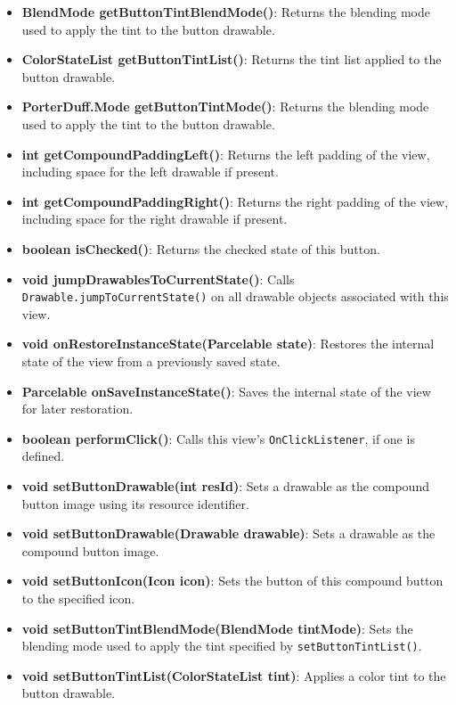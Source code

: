 \documentclass{report}
\begin{document}
\begin{itemize}
\begin{itemize}
                \item \textbf{BlendMode getButtonTintBlendMode()}: Returns the blending mode used to apply the tint to the button drawable.
                \item \textbf{ColorStateList getButtonTintList()}: Returns the tint list applied to the button drawable.
                \item \textbf{PorterDuff.Mode getButtonTintMode()}: Returns the blending mode used to apply the tint to the button drawable.
                \item \textbf{int getCompoundPaddingLeft()}: Returns the left padding of the view, including space for the left drawable if present.
                \item \textbf{int getCompoundPaddingRight()}: Returns the right padding of the view, including space for the right drawable if present.
                \item \textbf{boolean isChecked()}: Returns the checked state of this button.
                \item \textbf{void jumpDrawablesToCurrentState()}: Calls \texttt{Drawable.jumpToCurrentState()} on all drawable objects associated with this view.
                \item \textbf{void onRestoreInstanceState(Parcelable state)}: Restores the internal state of the view from a previously saved state.
                \item \textbf{Parcelable onSaveInstanceState()}: Saves the internal state of the view for later restoration.
                \item \textbf{boolean performClick()}: Calls this view’s \texttt{OnClickListener}, if one is defined.
                \item \textbf{void setButtonDrawable(int resId)}: Sets a drawable as the compound button image using its resource identifier.
                \item \textbf{void setButtonDrawable(Drawable drawable)}: Sets a drawable as the compound button image.
                \item \textbf{void setButtonIcon(Icon icon)}: Sets the button of this compound button to the specified icon.
                \item \textbf{void setButtonTintBlendMode(BlendMode tintMode)}: Sets the blending mode used to apply the tint specified by \texttt{setButtonTintList()}.
                \item \textbf{void setButtonTintList(ColorStateList tint)}: Applies a color tint to the button drawable.

\end{itemize}
\end{itemize}
\end{document}
